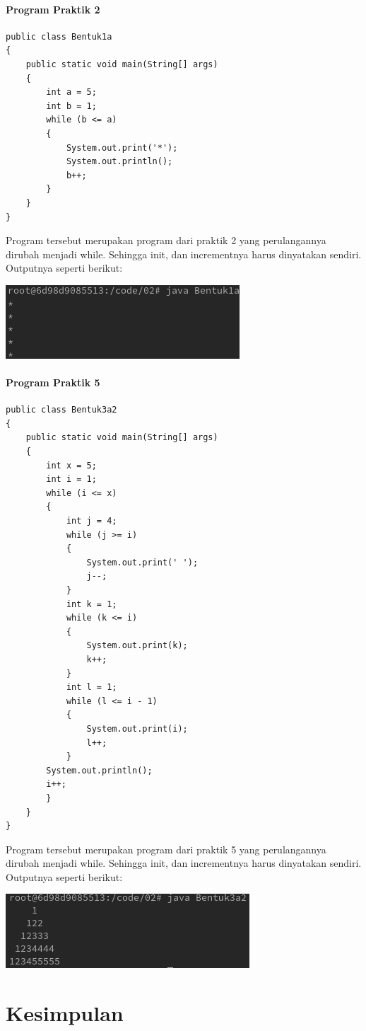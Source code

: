 \documentclass[a4paper,12pt]{article}
\begin{document}
\paragraph{Program Praktik 2\\}
\begin{center}
\begin{lstlisting}
public class Bentuk1a
{
    public static void main(String[] args)
    {
        int a = 5;
        int b = 1;
        while (b <= a)
        {
            System.out.print('*');
            System.out.println();
            b++;
        }
    }
}
\end{lstlisting}
\end{center}
Program tersebut merupakan program dari praktik 2 yang perulangannya dirubah menjadi while. Sehingga init, dan incrementnya harus dinyatakan sendiri.
Outputnya seperti berikut:\\
\begin{center}
    \includegraphics[scale=.7]{7.png}
\end{center}

\paragraph{Program Praktik 5}
\begin{center}
    \begin{lstlisting}
public class Bentuk3a2
{
    public static void main(String[] args)
    {
        int x = 5;
        int i = 1;
        while (i <= x)
        {
            int j = 4;
            while (j >= i)
            {
                System.out.print(' ');
                j--;
            }
            int k = 1;
            while (k <= i)
            {
                System.out.print(k);
                k++;
            }
            int l = 1;
            while (l <= i - 1)
            {
                System.out.print(i);
                l++;
            }
        System.out.println();
        i++;
        }
    }
}
    \end{lstlisting}
\end{center}
Program tersebut merupakan program dari praktik 5 yang perulangannya dirubah menjadi while. Sehingga init, dan incrementnya harus dinyatakan sendiri.
Outputnya seperti berikut:\\
\begin{center}
    \includegraphics[scale=.7]{8.png}
\end{center}


\newpage
\section{Kesimpulan}
\end{document}
